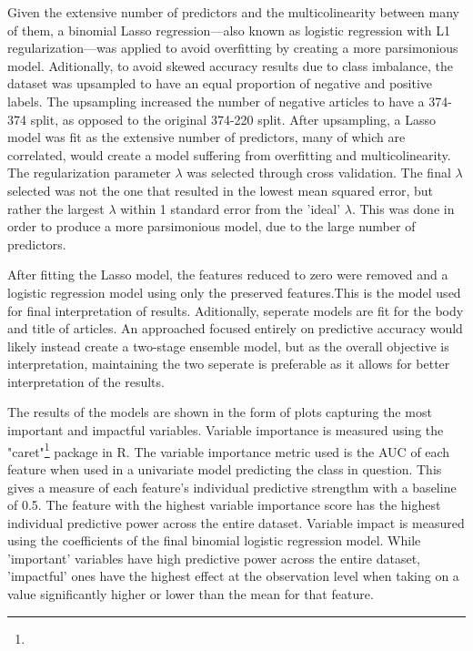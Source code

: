 \documentclass[../thesis.tex]{subfiles}
\begin{document}
Given the extensive number of predictors and the multicolinearity between many of them, a binomial Lasso regression---also known as logistic regression with L1 regularization---was applied to avoid overfitting by creating a more parsimonious model. Aditionally, to avoid skewed accuracy results due to class imbalance, the dataset was upsampled to have an equal proportion of negative and positive labels. The upsampling increased the number of negative articles to have a 374-374 split, as opposed to the original 374-220 split. After upsampling, a Lasso model was fit as the extensive number of predictors, many of which are correlated, would create a model suffering from overfitting and multicolinearity.  The regularization parameter  $\lambda$ was selected through cross validation. The final $\lambda$ selected was not the one that resulted in the lowest mean squared error, but rather the largest $\lambda$ within 1 standard error from the 'ideal' $\lambda$. This was done in order to produce a more parsimonious model, due to the large number of predictors.

After fitting the Lasso model, the features reduced to zero were removed and a logistic regression model using only the preserved features.This is the model used for final interpretation of results. Aditionally, seperate models are fit for the body and title of articles. An approached focused entirely on predictive accuracy would likely instead create a two-stage ensemble model, but as the overall objective is interpretation, maintaining the two seperate is preferable as it allows for better interpretation of the results.

The results of the models are shown in the form of plots capturing the most important and impactful variables. Variable importance is measured using the "caret"\footnote{} package in R. The variable importance metric used is the AUC of each feature when used in a univariate model predicting the class in question. This gives a measure of each feature's individual predictive strengthm with a baseline of 0.5. The feature with the highest variable importance score has the highest individual predictive power across the entire dataset. Variable impact is measured using the coefficients of the final binomial logistic regression model. While 'important' variables have high predictive power across the entire dataset, 'impactful' ones have the highest effect at the observation level when taking on a value significantly higher or lower than the mean for that feature.
\end{document}
